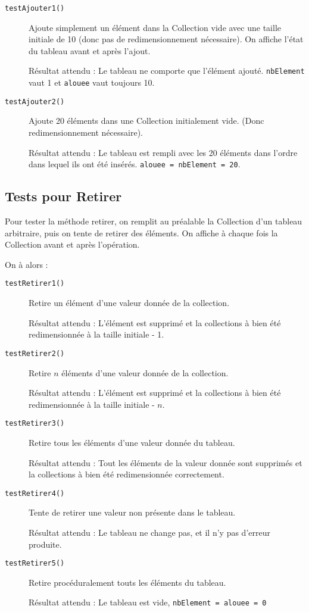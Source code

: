 \documentclass[11pt]{article}
\begin{document}
\begin{description}

	\item[\texttt{testAjouter1()}] Ajoute simplement un élément dans la Collection vide avec une taille initiale de 10 (donc pas de redimensionnement nécessaire). On affiche l'état du tableau avant et après l'ajout.
	
	Résultat attendu : Le tableau ne comporte que l'élément ajouté. \texttt{nbElement} vaut 1 et \texttt{alouee} vaut toujours 10. 
	
	\item[\texttt{testAjouter2()}] Ajoute 20 éléments dans une Collection initialement vide. (Donc redimensionnement nécessaire).
	
	Résultat attendu : Le tableau est rempli avec les 20 éléments dans l'ordre dans lequel ils ont été insérés. \texttt{alouee = nbElement = 20}.
	
\end{description}

\subsection{Tests pour Retirer}	
Pour tester la méthode retirer, on remplit au préalable la Collection d'un tableau arbitraire, puis on tente de retirer des éléments. On affiche à chaque fois la Collection avant et après l'opération.

On à alors :
\begin{description}
	\item[\texttt{testRetirer1()}] Retire un élément d'une valeur donnée de la collection.
	
	Résultat attendu : L'élément est supprimé et la collections à bien été redimensionnée à la taille initiale - 1.
	
	\item[\texttt{testRetirer2()}] Retire $n$ éléments d'une valeur donnée de la collection.
	
	Résultat attendu : L'élément est supprimé et la collections à bien été redimensionnée à la taille initiale - $n$.
	
	\item[\texttt{testRetirer3()}] Retire tous les éléments d'une valeur donnée du tableau.
	
	Résultat attendu : Tout les éléments de la valeur donnée sont supprimés et la collections à bien été redimensionnée correctement.
	
	\item[\texttt{testRetirer4()}] Tente de retirer une valeur non présente dans le tableau.
	
	Résultat attendu : Le tableau ne change pas, et il n'y pas d'erreur produite.
	
	\item[\texttt{testRetirer5()}] Retire procéduralement touts les éléments du tableau.
	
	Résultat attendu : Le tableau est vide, \texttt{nbElement = alouee = 0}
\end{description}
\end{document}

